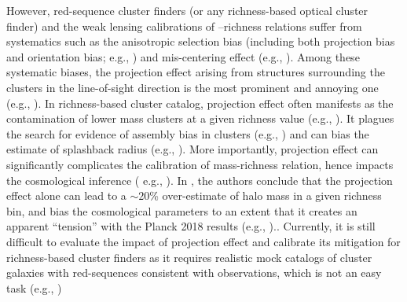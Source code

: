 \documentclass[fleqn,usenatbib,useAMS,english]{mnras}
\begin{document}
    However, red-sequence cluster finders (or any richness-based optical cluster finder) and
    the weak lensing calibrations of \mvir{}--richness relations suffer from systematics 
    such as the anisotropic selection bias (including both projection bias and orientation
    bias; e.g., \citealt{NohCohn2012, Dietrich2014, Osato2018, Herbonnet2019}) and 
    mis-centering effect (e.g., \citealt{Saro2015, Zhang2019b}).
    Among these systematic biases, the projection effect arising from structures surrounding the
    clusters in the line-of-sight direction is the most prominent and annoying one (e.g.,
    \citealt{Cohn2007, Erickson2011, Farahi2016, Zu2017, Busch2017, Costanzi2019, 
    Sunayama2019, Sunayama2020}).
    In richness-based cluster catalog, projection effect often manifests as the contamination of
    lower mass clusters at a given richness value (e.g., \citealt{Ge2019, Grandis2021, Myles2021}).
    It plagues the search for evidence of assembly bias in clusters (e.g., \citealt{Zu2017,
    Sunayama2019}) and can bias the estimate of splashback radius (e.g., \citealt{Busch2017,
    Sunayama2019}).
    More importantly, projection effect can significantly complicates the calibration of 
    mass-richness relation, hence impacts the cosmological inference (
    e.g., \citealt{Erickson2011, Costanzi2019, Sunayama2020, Wu2021}).
    In \citet{DES2020}, the authors conclude that the projection effect alone can lead to 
    a $\sim 20$\% over-estimate of halo mass in a given richness bin, and bias
    the cosmological parameters to an extent that it creates an apparent ``tension'' with
    the Planck 2018 results (e.g., \citealt{PLANCK2020})..
    Currently, it is still difficult to evaluate the impact of projection effect and
    calibrate its mitigation for richness-based cluster finders as it requires realistic mock
    catalogs of cluster galaxies with red-sequences consistent with observations, which 
    is not an easy task (e.g., \citealt{DeRose2019})
\end{document}
